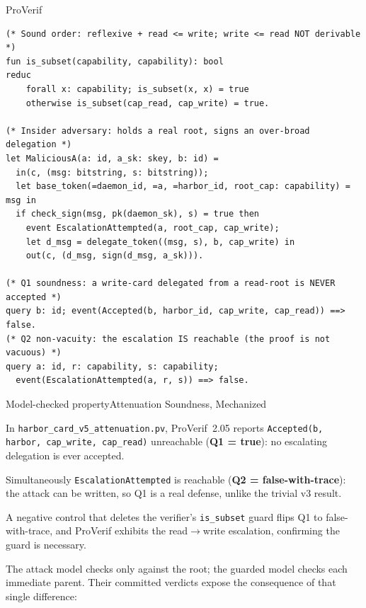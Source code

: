 \documentclass[11pt,a4paper]{article}
\theoremstyle{definition}
\begin{document}
\begin{pdlisting}{ProVerif}{}
\begin{lstlisting}[caption={\texttt{harbor\_card\_v5\_attenuation.pv} (excerpt, verified in ProVerif 2.05)}]
(* Sound order: reflexive + read <= write; write <= read NOT derivable *)
fun is_subset(capability, capability): bool
reduc
    forall x: capability; is_subset(x, x) = true
    otherwise is_subset(cap_read, cap_write) = true.

(* Insider adversary: holds a real root, signs an over-broad delegation *)
let MaliciousA(a: id, a_sk: skey, b: id) =
  in(c, (msg: bitstring, s: bitstring));
  let base_token(=daemon_id, =a, =harbor_id, root_cap: capability) = msg in
  if check_sign(msg, pk(daemon_sk), s) = true then
    event EscalationAttempted(a, root_cap, cap_write);
    let d_msg = delegate_token((msg, s), b, cap_write) in
    out(c, (d_msg, sign(d_msg, a_sk))).

(* Q1 soundness: a write-card delegated from a read-root is NEVER accepted *)
query b: id; event(Accepted(b, harbor_id, cap_write, cap_read)) ==> false.
(* Q2 non-vacuity: the escalation IS reachable (the proof is not vacuous) *)
query a: id, r: capability, s: capability;
  event(EscalationAttempted(a, r, s)) ==> false.
\end{lstlisting}
\end{pdlisting}

\begin{pdclaim}{Model-checked property}{Attenuation Soundness, Mechanized}
\setlength{\parskip}{4pt plus 1pt}
\label{thm:attn-sound}
\raggedright
In \texttt{harbor\_card\_v5\_attenuation.pv}, ProVerif~2.05 reports
\texttt{Accepted(b, harbor, cap\_write, cap\_read)} unreachable
(\textbf{Q1 = true}): no escalating delegation is ever accepted.

Simultaneously
\texttt{EscalationAttempted} is reachable (\textbf{Q2 = false-with-trace}):
the attack can be written, so Q1 is a real defense, unlike the trivial v3 result.

A
negative control that deletes the verifier's \texttt{is\_subset} guard flips
Q1 to false-with-trace, and ProVerif exhibits the read$\to$write escalation,
confirming the guard is necessary.
\end{pdclaim}

The attack model checks only against the root; the guarded model checks each
immediate parent. Their committed verdicts expose the consequence of that
single difference:
\end{document}
